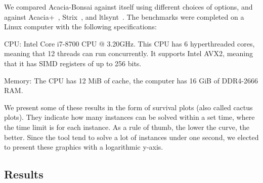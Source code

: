 \documentclass[runningheads,a4paper]{llncs}
\begin{document}
We compared Acacia-Bonsai against itself using different choices of options, and
against Acacia+~\cite{bbfjr12}, Strix~\cite{msl18}, and
ltlsynt~\cite{duret.16.atva2}.  The benchmarks were completed on a
Linux computer with the following specifications:
\begin{compactitem}
\item CPU: Intel\textregistered{} Core\texttrademark{} i7-8700 CPU @ 3.20GHz.  This CPU
  has 6 hyperthreaded cores, meaning that 12 threads can run concurrently.  It
  supports Intel\textregistered{} AVX2, meaning that it has SIMD registers of up to
  256 bits.
\item Memory: The CPU has 12 MiB of cache, the computer has 16 GiB of DDR4-2666
  RAM.
\end{compactitem}

We present some of these results in the form of survival plots (also called
cactus plots).  They indicate how many instances can be solved within a set
time, where the time limit is for each instance.  As a rule of thumb, the lower
the curve, the better.  Since the tool tend to solve a lot of instances under
one second, we elected to present these graphics with a logarithmic y-axis.

\subsection{Results}
\end{document}
